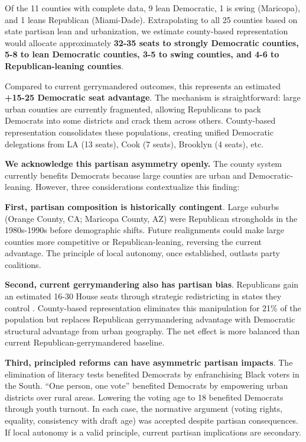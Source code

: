 Of the 11 counties with complete data, 9 lean Democratic, 1 is swing (Maricopa), and 1 leans Republican (Miami-Dade). Extrapolating to all 25 counties based on state partisan lean and urbanization, we estimate county-based representation would allocate approximately \textbf{32-35 seats to strongly Democratic counties, 5-8 to lean Democratic counties, 3-5 to swing counties, and 4-6 to Republican-leaning counties}.

Compared to current gerrymandered outcomes, this represents an estimated \textbf{+15-25 Democratic seat advantage}. The mechanism is straightforward: large urban counties are currently fragmented, allowing Republicans to pack Democrats into some districts and crack them across others. County-based representation consolidates these populations, creating unified Democratic delegations from LA (13 seats), Cook (7 seats), Brooklyn (4 seats), etc.

\textbf{We acknowledge this partisan asymmetry openly.} The county system currently benefits Democrats because large counties are urban and Democratic-leaning. However, three considerations contextualize this finding:

\textbf{First, partisan composition is historically contingent}. Large suburbs (Orange County, CA; Maricopa County, AZ) were Republican strongholds in the 1980s-1990s before demographic shifts. Future realignments could make large counties more competitive or Republican-leaning, reversing the current advantage. The principle of local autonomy, once established, outlasts party coalitions.

\textbf{Second, current gerrymandering also has partisan bias}. Republicans gain an estimated 16-30 House seats through strategic redistricting in states they control \citep{chen2013unintentional, mcghee2014measuring}. County-based representation eliminates this manipulation for 21\% of the population but replaces Republican gerrymandering advantage with Democratic structural advantage from urban geography. The net effect is more balanced than current Republican-gerrymandered baseline.

\textbf{Third, principled reforms can have asymmetric partisan impacts}. The elimination of literacy tests benefited Democrats by enfranchising Black voters in the South. ``One person, one vote'' benefited Democrats by empowering urban districts over rural areas. Lowering the voting age to 18 benefited Democrats through youth turnout. In each case, the normative argument (voting rights, equality, consistency with draft age) was accepted despite partisan consequences. If local autonomy is a valid principle, current partisan implications are secondary.
